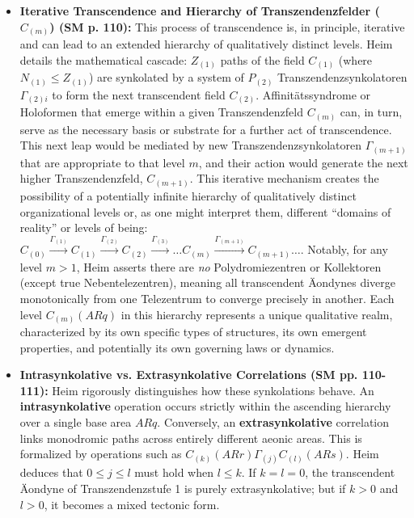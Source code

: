 \documentclass[12pt]{article}
\newcommand{\q}[1]{\enquote{#1}}
\begin{document}
\begin{itemize}
    \item \textbf{Iterative Transcendence and Hierarchy of Transzendenzfelder (\(C_{(m)}\)) (SM p. 110):}
    This process of transcendence is, in principle, iterative and can lead to an extended hierarchy of qualitatively distinct levels. Heim details the mathematical cascade: \(Z_{(1)}\) paths of the field \(C_{(1)}\) (where \(N_{(1)} \le Z_{(1)}\)) are synkolated by a system of \(P_{(2)}\) Transzendenzsynkolatoren \(\Gamma_{(2)i}\) to form the next transcendent field \(C_{(2)}\). Affinitätssyndrome or Holoformen that emerge within a given Transzendenzfeld \( C_{(m)} \) can, in turn, serve as the necessary basis or substrate for a further act of transcendence. This next leap would be mediated by new Transzendenzsynkolatoren \( \Gamma_{(m+1)} \) that are appropriate to that level \(m\), and their action would generate the next higher Transzendenzfeld, \( C_{(m+1)} \). This iterative mechanism creates the possibility of a potentially infinite hierarchy of qualitatively distinct organizational levels or, as one might interpret them, different \q{domains of reality} or levels of being: \( C_{(0)} \xrightarrow{\Gamma_{(1)}} C_{(1)} \xrightarrow{\Gamma_{(2)}} C_{(2)} \xrightarrow{\Gamma_{(3)}} \dots C_{(m)} \xrightarrow{\Gamma_{(m+1)}} C_{(m+1)} \dots \). Notably, for any level \(m > 1\), Heim asserts there are \textit{no} Polydromiezentren or Kollektoren (except true Nebentelezentren), meaning all transcendent Äondynes diverge monotonically from one Telezentrum to converge precisely in another. Each level \( C_{(m)}(AR q) \) in this hierarchy represents a unique qualitative realm, characterized by its own specific types of structures, its own emergent properties, and potentially its own governing laws or dynamics.

    \item \textbf{Intrasynkolative vs. Extrasynkolative Correlations (SM pp. 110-111):} 
    Heim rigorously distinguishes how these synkolations behave. An \textbf{intrasynkolative} operation occurs strictly within the ascending hierarchy over a single base area \(A R q\). Conversely, an \textbf{extrasynkolative} correlation links monodromic paths across entirely different aeonic areas. This is formalized by operations such as \( C_{(k)}(A R r) \Gamma_{(j)} C_{(l)}(A R s) \). Heim deduces that \( 0 \le j \le l \) must hold when \( l \le k \). If \( k=l=0 \), the transcendent Äondyne of Transzendenzstufe 1 is purely extrasynkolative; but if \( k > 0 \) and \( l > 0 \), it becomes a mixed tectonic form.


\end{itemize}
\end{document}
